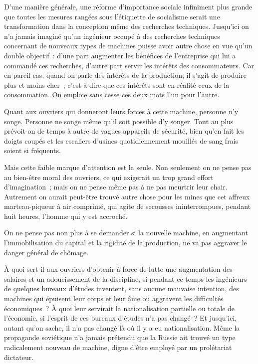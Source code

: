 \documentclass[french,twoside]{book} %
\begin{document}
D'une manière générale, une réforme d'importance sociale infiniment plus grande que toutes les mesures rangées sous l'étiquette de socialisme serait une transformation dans la conception même des recherches techniques. Jusqu'ici on n'a jamais imaginé qu'un ingénieur occupé à des recherches techniques concernant de nouveaux types de machines puisse avoir autre chose en vue qu'un double objectif : d'une part augmenter les bénéfices de l'entreprise qui lui a commandé ces recherches, d'autre part servir les intérêts des consommateurs. Car en pareil cas, quand on parle des intérêts de la production, il s'agit de produire plus et moins cher ; c'est-à-dire que ces intérêts sont en réalité ceux de la consommation. On emploie sans cesse ces deux mots l'un pour l'autre.\par
Quant aux ouvriers qui donneront leurs forces à cette machine, personne n'y songe. Personne ne songe même qu'il soit possible d'y songer. Tout au plus prévoit-on de temps à autre de vagues appareils de sécurité, bien qu'en fait les doigts coupés et les escaliers d'usines quotidiennement mouillés de sang frais soient si fréquents.\par
Mais cette faible marque d'attention est la seule. Non seulement on ne pense pas au bien-être moral des ouvriers, ce qui exigerait un trop grand effort d'imagination ; mais on ne pense même pas à ne pas meurtrir leur chair. Autrement on aurait peut-être trouvé autre chose pour les mines que cet affreux marteau-piqueur à air comprimé, qui agite de secousses ininterrompues, pendant huit heures, l'homme qui y est accroché.\par
On ne pense pas non plus à se demander si la nouvelle machine, en augmentant l'immobilisation du capital et la rigidité de la production, ne va pas aggraver le danger général de chômage.\par
À quoi sert-il aux ouvriers d'obtenir à force de lutte une augmentation des salaires et un adoucissement de la discipline, si pendant ce temps les ingénieurs de quelques bureaux d'études inventent, sans aucune mauvaise intention, des machines qui épuisent leur corps et leur âme ou aggravent les difficultés économiques ? À quoi leur servirait la nationalisation partielle ou totale de l'économie, si l'esprit de ces bureaux d'études n'a pas changé ? Et jusqu'ici, autant qu'on sache, il n'a pas changé là où il y a eu nationalisation. Même la propagande soviétique n'a jamais prétendu que la Russie ait trouvé un type radicalement nouveau de machine, digne d'être employé par un prolétariat dictateur.\par
\end{document}
